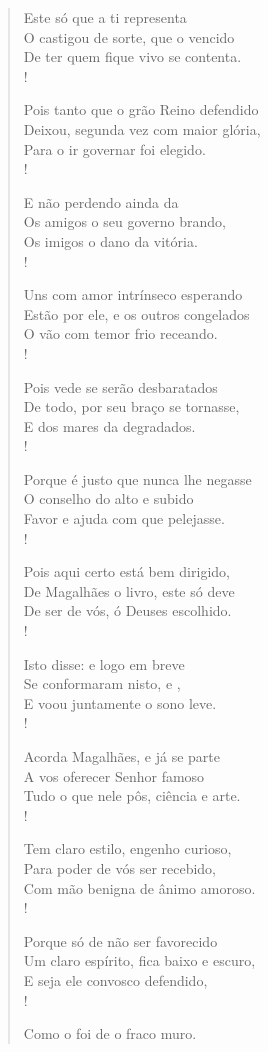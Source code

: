 \begin{verse}
Este só que a ti  representa\\
O castigou de sorte, que o vencido\\
De ter quem fique vivo se contenta.\\!

Pois tanto que o grão Reino defendido\\
Deixou, segunda vez com maior glória,\\
Para o ir governar foi elegido.\\!   
 
E não perdendo ainda da \\
Os amigos o seu governo brando,\\
Os imigos o dano da vitória.\\!

Uns com amor intrínseco esperando\\
Estão por ele, e os outros congelados\\
O vão com temor frio receando.\\!

Pois vede se serão desbaratados\\
De todo, por seu braço se tornasse,\\
E dos mares da  degradados.\\!

Porque é justo que nunca lhe negasse\\
O conselho do  alto e subido\\
Favor e ajuda com que pelejasse.\\!

Pois aqui certo está bem dirigido,\\
De Magalhães o livro, este só deve\\		%
De ser de vós, ó Deuses escolhido.\\!

Isto  disse: e logo em breve\\
Se conformaram nisto,  e ,\\
E voou juntamente o sono leve.\\!

Acorda Magalhães, e já se parte\\
A vos oferecer Senhor famoso\\
Tudo o que nele pôs, ciência e arte.\\!

Tem claro estilo, engenho curioso,\\		%
Para poder de vós ser recebido,\\
Com mão benigna de ânimo amoroso.\\!
 
Porque só de não ser favorecido\\
Um claro espírito, fica baixo e escuro,\\
E seja ele convosco defendido,\\!

Como o foi de  o fraco muro.\\
\end{verse}





